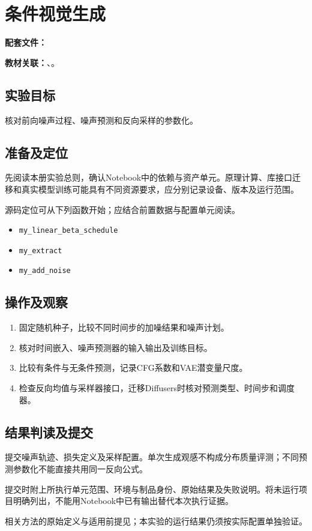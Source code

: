 \chapter{条件视觉生成}
\label{lab:E50_cv_diffusion}

\noindent\textbf{配套文件：}\par
\noindent\textbf{教材关联：}、。

\section*{实验目标}
核对前向噪声过程、噪声预测和反向采样的参数化。

\section*{准备及定位}
先阅读本册实验总则，确认Notebook中的依赖与资产单元。原理计算、库接口迁移和真实模型训练可能具有不同资源要求，应分别记录设备、版本及运行范围。

源码定位可从下列函数开始；应结合前置数据与配置单元阅读。
\begin{itemize}
\item \texttt{my\_linear\_beta\_schedule}
\item \texttt{my\_extract}
\item \texttt{my\_add\_noise}
\end{itemize}

\section*{操作及观察}
\begin{enumerate}
\item 固定随机种子，比较不同时间步的加噪结果和噪声计划。
\item 核对时间嵌入、噪声预测器的输入输出及训练目标。
\item 比较有条件与无条件预测，记录CFG系数和VAE潜变量尺度。
\item 检查反向均值与采样器接口，迁移Diffusers时核对预测类型、时间步和调度器。
\end{enumerate}

\section*{结果判读及提交}
提交噪声轨迹、损失定义及采样配置。单次生成观感不构成分布质量评测；不同预测参数化不能直接共用同一反向公式。

提交时附上所执行单元范围、环境与制品身份、原始结果及失败说明。将未运行项目明确列出，不能用Notebook中已有输出替代本次执行证据。

相关方法的原始定义与适用前提见\cite{ho2020ddpm}；本实验的运行结果仍须按实际配置单独验证。
